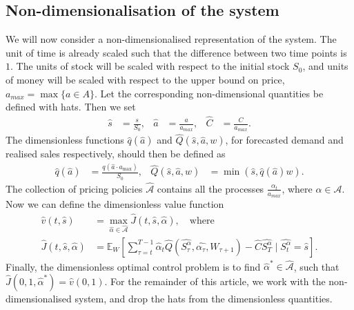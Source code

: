 \documentclass[main.tex]{subfiles}
\begin{document}
\subsection{Non-dimensionalisation of the system}
We will now consider a non-dimensionalised
representation of the system.
The unit of time is already scaled such that
the difference between two time points is $1$.
The units of stock will be  scaled with
respect to
the initial stock $S_0$, and units of money will be scaled with respect to
the upper bound on
price, $a_{max}=\max\{a\in A\}$.
Let the corresponding non-dimensional quantities be defined with hats.
Then we set
\begin{align}
  \hat s &= \frac{s}{S_0},&\hat a&=\frac{a}{a_{max}},&\hat C&=\frac{C}{a_{max}}.
\end{align}
The dimensionless functions $\hat q(\hat a)$ and $\hat Q(\hat s,\hat a, w)$,
for forecasted demand
and realised sales respectively, should then be defined as
\begin{align}
  \hat q(\hat a)&= \frac{q(\hat a\cdot a_{\max})}{S_0},
  &\hat Q(\hat s,\hat a,w)&= \min(\hat s, \hat q(\hat a)w).
\end{align}
The collection of pricing policies $\hat{\mathcal A}$ contains all
the processes $\frac{\alpha_t}{a_{max}}$, where $\alpha\in \mathcal
A$. Now we can define the dimensionless value function
\begin{align}\label{eq:value_function_def_nondim}
  \hat v(t,\hat s)&=\max_{\hat \alpha\in\hat{\mathcal A}}
                    \hat J(t,\hat s,\hat \alpha),\quad\text{where}\\
  \hat J(t,\hat s,\hat \alpha)&=
                 \mathbb E_{W}\left[ \sum_{\tau=t}^{T-1}
                 \hat \alpha_t\hat Q(\hat {S_\tau^\alpha},\hat{\alpha_\tau},W_{\tau+1})
                 - \hat C \hat{S_T^\alpha} \mid \hat{S_t^\alpha} =
                                \hat s
                 \right].
                 \label{eq:value_function_def_nondim2}
\end{align}
Finally, the dimensionless optimal control problem
is to find $\hat \alpha^*\in\hat{\mathcal A}$, such that
$\hat J(0,1,\hat \alpha^*)=\hat v(0,1)$.
For the remainder of this article, we work with the
non-dimensionalised system, and drop the hats from the
dimensionless quantities.
\end{document}
